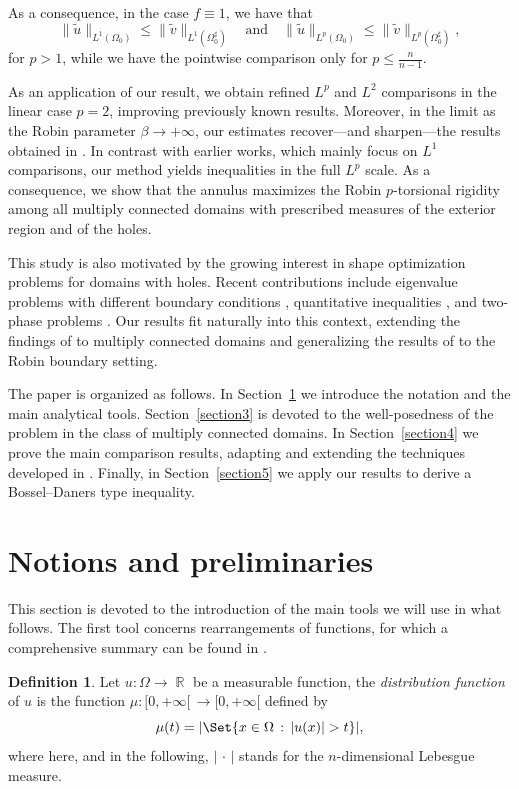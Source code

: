 \documentclass[12pt]{article}
\newcommand{\abs}[1]{{\left|#1\right|}}
\theoremstyle{definition}
\newtheorem{definizione}{Definition}[section]
\theoremstyle{plain}
\theoremstyle{definition}
\DeclareMathOperator{\R}{\mathbb{R}}
\begin{document}
As a consequence, in the case $f\equiv 1$, we have that
\begin{equation*}
    \|\tilde u\|_{L^1(\Omega_0)}\leq \|\tilde v\|_{L^1(\Omega_0^\sharp)}\quad \text{and}\quad \|\tilde u\|_{L^p(\Omega_0)}\leq \|\tilde v\|_{L^p(\Omega_0^\sharp)},
\end{equation*}
for $p>1$, while we have the pointwise comparison only for $p\leq\frac{n}{n-1}$.

As an application of our result, we obtain refined $L^p$ and $L^2$ comparisons in the linear case $p=2$, improving previously known results. Moreover, in the limit as the Robin parameter $\beta \to +\infty$, our estimates recover—and sharpen—the results obtained in \cite{B2}. In contrast with earlier works, which mainly focus on $L^1$ comparisons, our method yields inequalities in the full $L^p$ scale. As a consequence, we show that the annulus maximizes the Robin $p$-torsional rigidity among all multiply connected domains with prescribed measures of the exterior region and of the holes.

This study is also motivated by the growing interest in shape optimization problems for domains with holes. Recent contributions include eigenvalue problems with different boundary conditions \cite{DPP,PPT,PW2,PW}, quantitative inequalities \cite{AB2,CPP}, and two-phase problems \cite{F,MNP}. Our results fit naturally into this context, extending the findings of \cite{ANT,AGM} to multiply connected domains and generalizing the results of \cite{B,B2} to the Robin boundary setting.

The paper is organized as follows. In Section~\ref{section2} we introduce the notation and the main analytical tools. Section~\ref{section3} is devoted to the well-posedness of the problem in the class of multiply connected domains. In Section~\ref{section4} we prove the main comparison results, adapting and extending the techniques developed in \cite{ANT}. Finally, in Section~\ref{section5} we apply our results to derive a Bossel--Daners type inequality.
\section{Notions and preliminaries}\label{section2}
This section is devoted to the introduction of the main tools we will use in what follows. The first tool concerns rearrangements of functions, for which a comprehensive summary can be found in \cite{K}.\\
    \begin{definizione}
	Let $u: \Omega \to \R$ be a measurable function, the \emph{distribution function} of $u$ is the function $\mu : [0,+\infty[\, \to [0, +\infty[$ defined by
	$$
	\mu(t)= \abs{\Set{x \in \Omega \, :\,  \abs{u(x)} > t}},
	$$
    where here, and in the following, $\abs{\,\cdot\,}$ stands for the $n$-dimensional Lebesgue measure.
\end{definizione}
\end{document}
